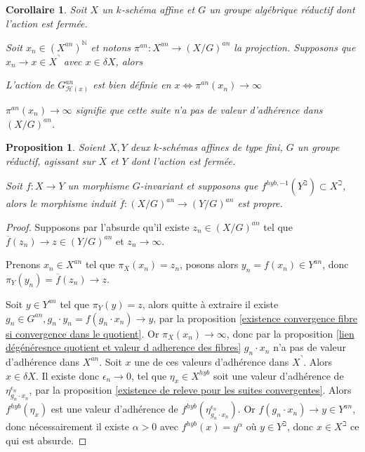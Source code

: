 \documentclass[11pt]{article}
\newcommand{\N}{\mathbb{N}}
\newtheorem{prop}[thm]{Proposition}
\newtheorem{cor}[thm]{Corollaire}
\begin{document}
\begin{cor}
Soit $X$ un $k$-schéma affine et $G$ un groupe algébrique réductif dont l'action est fermée.

Soit $x_n \in (X^{an})^\N$ et notons $\pi^{an} : X^{an} \rightarrow (X/G)^{an}$ la projection. Supposons que $x_n \rightarrow x \in X^\urcorner$ avec $x\in \delta X$, alors
\begin{center}
L'action de $G_{\mathcal{H}(x)}^{an}$ est bien définie en $x \iff \pi^{an}(x_n) \rightarrow \infty$
\end{center} 
$\pi^{an}(x_n) \rightarrow \infty$ signifie que cette suite n'a pas de valeur d'adhérence dans $(X/G)^{an}$.
\end{cor}

\begin{prop}\label{propreté morphisme sur le quotient}
Soient $X, Y$ deux $k$-schémas affines de type fini, $G$ un groupe réductif, agissant sur $X$ et $Y$ dont l'action est fermée.

Soit $f : X \rightarrow Y$ un morphisme $G$-invariant et supposons que $f^{hyb,-1}(Y^\beth) \subset X^\beth$, alors le morphisme induit $\overline{f} : (X/G)^{an}  \rightarrow (Y/G)^{an}$ est propre.  
\end{prop}
\begin{proof}
Supposons par l'absurde qu'il existe $z_n \in (X/G)^{an}$ tel que $\overline{f}(z_n) \rightarrow z \in (Y/G)^{an}$ et $z_n \rightarrow \infty$.

Prenons $x_n\in X^{an}$ tel que $\pi_X(x_n) = z_n$, posons alors $y_n = f(x_n) \in Y^{an}$, donc $\pi_Y(y_n) = \overline{f}(z_n) \rightarrow z$.

Soit $y\in Y^{an}$ tel que $\pi_Y(y) = z$, alors quitte à extraire il existe $g_n\in G^{an}, g_n\cdot y_n = f(g_n\cdot x_n) \rightarrow y$, par la proposition \ref{existence convergence fibre si convergence dans le quotient}. Or $\pi_X(x_n) \rightarrow \infty$, donc par la proposition \ref{lien dégénéresnce quotient et valeur d adherence des fibres} $g_n\cdot x_n$ n'a pas de valeur d'adhérence dans $X^{an}$. Soit $x$ une de ces valeurs d'adhérence dans $X^\urcorner$. Alors $x\in \delta X$. Il existe donc $\epsilon_n \rightarrow 0$, tel que $\eta_x \in X^{hyb}$ soit une valeur d'adhérence de $\eta_{g_n\cdot x_n}^{\epsilon_n}$, par la proposition \ref{existence de releve pour les suites convergentes}. Alors $f^{hyb}(\eta_x)$ est une valeur d'adhérence de $f^{hyb}(\eta_{g_n \cdot x_n}^{\epsilon_n})$. Or $f(g_n \cdot x_n)\rightarrow y \in Y^{an}$, donc nécessairement il existe $\alpha >0$ avec $f^{hyb}(x) = y^\alpha$ où $y \in Y^\beth$, donc $x\in X^\beth$ ce qui est absurde.
\end{proof}
\end{document}
